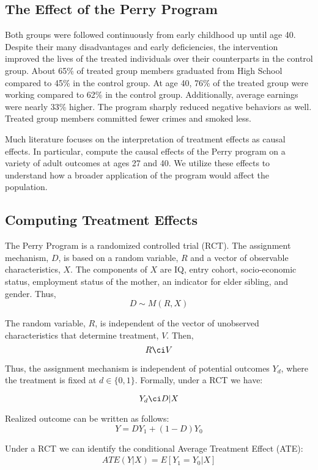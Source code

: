 \subsection{The Effect of the Perry Program}
Both groups were followed continuously from early childhood up until age 40. Despite their many disadvantages and early deficiencies, the intervention improved the lives of the treated individuals over their counterparts in the control group. About 65\% of treated group members graduated from High School compared to 45\% in the control group. At age 40, 76\% of the treated group were working compared to 62\% in the control group. Additionally, average earnings were nearly 33\% higher. The program sharply reduced negative behaviors as well. Treated group members committed fewer crimes and smoked less. 

Much literature focuses on the interpretation of treatment effects as causal effects. In particular, \citet{heckman2010analyzing} compute the causal effects of the Perry program on a variety of adult outcomes at ages 27 and 40. We utilize these effects to understand how a broader application of the program would affect the population. 

\subsection{Computing Treatment Effects}
The Perry Program is a randomized controlled trial (RCT). The assignment mechanism, $D$, is based on a random variable, $R$ and a vector of observable characteristics, $X$. The components of $X$ are IQ, entry cohort, socio-economic status, employment status of the mother, an indicator for elder sibling, and gender. Thus,
\[
D\sim M(R,X)
\]

\noindent The random variable, $R$, is independent of the vector of unobserved characteristics that determine treatment, $V$.  Then, 
\[
R\ci V
\]

\noindent Thus, the assignment mechanism is independent of potential outcomes $Y_{d}$, where the treatment is fixed at $d \in \{0,1\}$. Formally, under a RCT we have:

\[
 Y_d \ci D|X
 \]


\noindent Realized outcome can be written as follows:
\[
Y=DY_{1}+\left(1-D\right)Y_{0}
\]


\noindent Under a RCT we can identify the conditional Average Treatment Effect (ATE):
\begin{eqnarray*}
ATE(Y|X) = E[Y_1 = Y_0 | X]
\end{eqnarray*}


